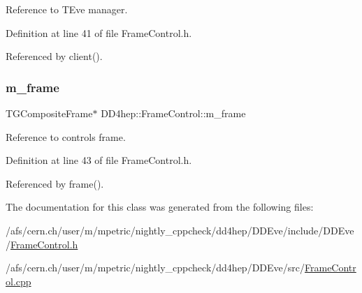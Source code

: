 Reference to T\+Eve manager. 



Definition at line 41 of file Frame\+Control.\+h.



Referenced by client().

\hypertarget{class_d_d4hep_1_1_frame_control_aae98fb770d6e50d5df6ed082cd5118ac}{}\label{class_d_d4hep_1_1_frame_control_aae98fb770d6e50d5df6ed082cd5118ac} 
\subsubsection{\texorpdfstring{m\+\_\+frame}{m\_frame}}
{\footnotesize\ttfamily T\+G\+Composite\+Frame$\ast$ D\+D4hep\+::\+Frame\+Control\+::m\+\_\+frame\hspace{0.3cm}{\ttfamily [protected]}}



Reference to control\textquotesingle{}s frame. 



Definition at line 43 of file Frame\+Control.\+h.



Referenced by frame().



The documentation for this class was generated from the following files\+:\begin{DoxyCompactItemize}
\item 
/afs/cern.\+ch/user/m/mpetric/nightly\+\_\+cppcheck/dd4hep/\+D\+D\+Eve/include/\+D\+D\+Eve/\hyperlink{_frame_control_8h}{Frame\+Control.\+h}\item 
/afs/cern.\+ch/user/m/mpetric/nightly\+\_\+cppcheck/dd4hep/\+D\+D\+Eve/src/\hyperlink{_frame_control_8cpp}{Frame\+Control.\+cpp}\end{DoxyCompactItemize}
